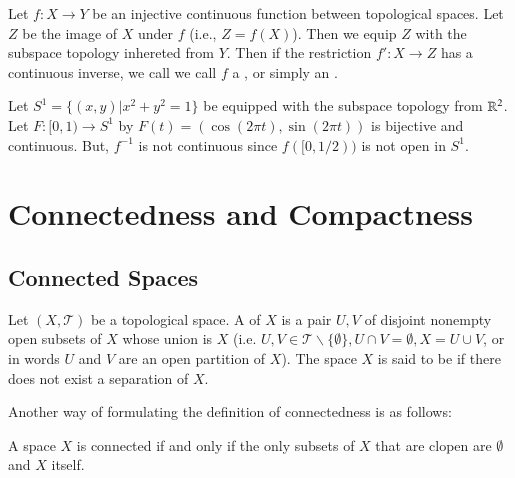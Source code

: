 \documentclass[12pt, a4paper, oneside, openright, titlepage]{book}
\begin{document}
\begin{definition}
    Let $f:X\rightarrow Y$ be an injective continuous function between topological spaces. Let $Z$ be the image of $X$ under $f$ (i.e., $Z = f(X)$). Then we equip $Z$ with the subspace topology inhereted from $Y$. Then if the restriction $f':X\rightarrow Z$ has a continuous inverse, we call we call $f$ a , or simply an .
\end{definition}

\begin{example}
    Let $S^1 = \{(x,y)\vert x^2+y^2 = 1\}$ be equipped with the subspace topology from $\mathbb R^2$. Let $F:[0,1)\rightarrow S^1$ by $F(t) = (\cos(2\pi t), \sin(2\pi t))$ is bijective and continuous. But, $f^{-1}$ is not continuous since $f([0,1/2))$ is not open in $S^1$.
\end{example}



\chapter{ Connectedness and Compactness}


\section{Connected Spaces}

\begin{definition}
    Let $(X,\mathcal{T})$ be a topological space. A  of $X$ is a pair $U,V$ of disjoint nonempty open subsets of $X$ whose union is $X$ (i.e. $U,V \in \mathcal{T}\backslash\{\emptyset\}, U\cap V = \emptyset, X = U\cup V$, or in words $U$ and $V$ are an open partition of $X$). The space $X$ is said to be  if there does not exist a separation of $X$.
\end{definition}

Another way of formulating the definition of connectedness is as follows:
\begin{center}
    A space $X$ is connected if and only if the only subsets of $X$ that are clopen are $\emptyset$ and $X$ itself.
\end{center}
\end{document}

